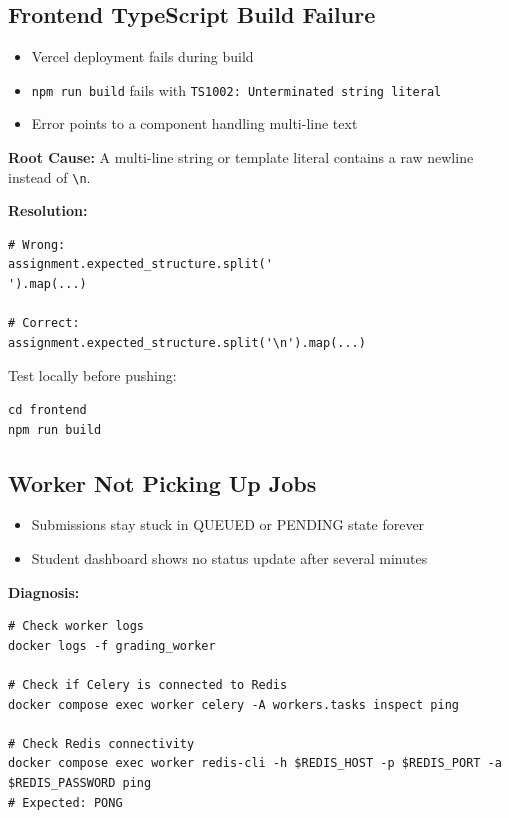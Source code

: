 \documentclass[12pt,a4paper]{article}
\begin{document}
\subsection{Frontend TypeScript Build Failure}

\begin{troublebox}[Symptoms]
\begin{itemize}
  \item Vercel deployment fails during build
  \item \texttt{npm run build} fails with \texttt{TS1002: Unterminated string literal}
  \item Error points to a component handling multi-line text
\end{itemize}
\end{troublebox}

\textbf{Root Cause:} A multi-line string or template literal contains a raw newline instead of \texttt{\textbackslash n}.

\textbf{Resolution:}

\begin{lstlisting}[style=terminal]
# Wrong:
assignment.expected_structure.split('
').map(...)

# Correct:
assignment.expected_structure.split('\n').map(...)
\end{lstlisting}

Test locally before pushing:
\begin{lstlisting}[style=terminal]
cd frontend
npm run build
\end{lstlisting}

\subsection{Worker Not Picking Up Jobs}

\begin{troublebox}[Symptoms]
\begin{itemize}
  \item Submissions stay stuck in QUEUED or PENDING state forever
  \item Student dashboard shows no status update after several minutes
\end{itemize}
\end{troublebox}

\textbf{Diagnosis:}

\begin{lstlisting}[style=terminal]
# Check worker logs
docker logs -f grading_worker

# Check if Celery is connected to Redis
docker compose exec worker celery -A workers.tasks inspect ping

# Check Redis connectivity
docker compose exec worker redis-cli -h $REDIS_HOST -p $REDIS_PORT -a $REDIS_PASSWORD ping
# Expected: PONG
\end{lstlisting}
\end{document}
